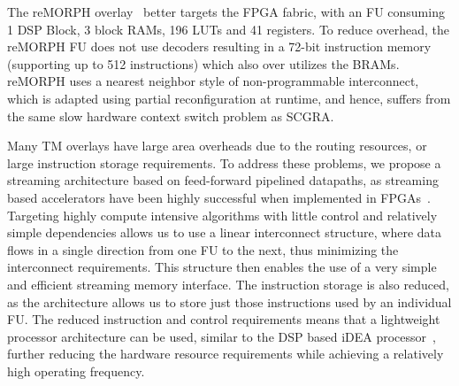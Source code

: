 The reMORPH overlay~\cite{paul2012remorph} better targets the FPGA fabric, with an FU consuming 1 DSP Block, 3 block RAMs, 196 LUTs and 41 registers.
To reduce overhead, the reMORPH FU does not use decoders resulting in a 72-bit instruction memory (supporting up to 512 instructions) which also over utilizes the BRAMs.
reMORPH uses a nearest neighbor style of non-programmable interconnect, which is adapted using partial reconfiguration at runtime, and hence, suffers from the same slow hardware context switch problem as SCGRA.


Many TM overlays have large area overheads due to the routing resources, or large instruction storage requirements.
To address these problems, we propose a streaming architecture based on feed-forward pipelined datapaths, as streaming based accelerators have been highly successful when implemented in FPGAs~\cite{oliver2005reconfigurable, saqib2015pipelined}. Targeting highly compute intensive algorithms with little control and relatively simple dependencies allows us to use a linear interconnect structure, where data flows in a single direction from one FU to the next, thus minimizing the interconnect requirements. This structure then enables the use of a very simple and efficient streaming memory interface. The instruction storage is also reduced, as the architecture allows us to store just those instructions used by an individual FU. The reduced instruction and control requirements means that a lightweight processor architecture can be used, similar to the DSP based iDEA processor~\cite{cheah2014idea}, further reducing the hardware resource requirements while achieving a relatively high operating frequency.

\begin{comment}
Most of the time multiplexed overlays described above suffer from large area overheads due to the routing resources, or the large instruction storage requirements.
To address these issues, we propose a streaming architecture based on feed-forward pipelined datapaths, as accelerators based on the streaming model have been highly successful when implemented in FPGAs~\cite{oliver2005reconfigurable, saqib2015pipelined}. Targeting highly compute intensive algorithms with little control and relatively simple dependencies allows us to use a simple linear interconnect structure, where data flows in a single direction from one FU to the next, thus minimizing the interconnect requirements. This structure then enables the use of a very simple and efficient streaming memory interface. The instruction storage is also reduced, as the architecture allows us to store just those instructions used by an individual FU. The reduced instruction and control requirements means that a lightweight processor architecture can be used, similar to the DSP based iDEA processor~\cite{cheah2014idea}, further reducing the hardware resource requirements while achieving a relatively high operating frequency.
\end{comment}

